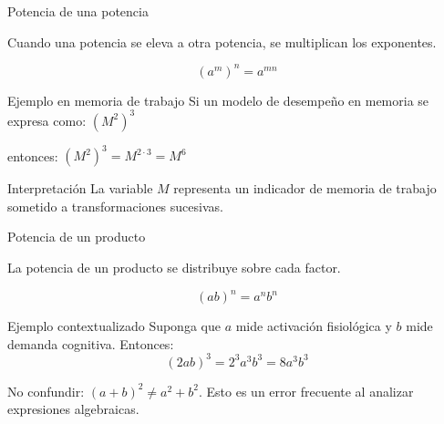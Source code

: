 \documentclass[aspectratio=169]{beamer}
\begin{document}
	
	\begin{frame}{Potencia de una potencia}
		\begin{idea}
			Cuando una potencia se eleva a otra potencia, se multiplican los exponentes.
		\end{idea}
		
		\[
		(a^m)^n=a^{mn}
		\]
		
		\pause
		
		\begin{exampleblock}{Ejemplo en memoria de trabajo}
			Si un modelo de desempeño en memoria se expresa como:
			$(M^2)^3$
				
			entonces: $(M^2)^3=M^{2\cdot 3}=M^6$
		\end{exampleblock}
		
		\pause
		
		\begin{block}{Interpretación}
			La variable \(M\) representa un indicador de memoria de trabajo sometido a transformaciones sucesivas.
		\end{block}
	\end{frame}
	
	
	\begin{frame}{Potencia de un producto}
		\begin{idea}
			La potencia de un producto se distribuye sobre cada factor.
		\end{idea}		
		\[
		(ab)^n=a^n b^n
		\]
		
		\pause
		
		\begin{exampleblock}{Ejemplo contextualizado}
			Suponga que \(a\) mide activación fisiológica y \(b\) mide demanda cognitiva. Entonces:			
			\[
			(2ab)^3=2^3a^3b^3=8a^3b^3
			\]
		\end{exampleblock}
		
		\pause
		
		\begin{alerta}
			No confundir: $(a+b)^2\neq a^2+b^2$. Esto es un error frecuente al analizar expresiones algebraicas.
		\end{alerta}
	\end{frame}
	
	
\end{document}
